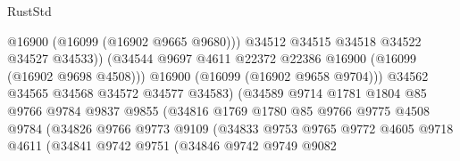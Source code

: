 \begin{lexlean}{RustStd}
\begin{coremodule}
                                          @16900
                                          (@16099 (@16902 @9665 @9680)))
                                        @34512
                                        @34515
                                        @34518
                                        @34522
                                        @34527
                                        @34533))
                                    (@34544
                                      @9697
                                      @4611
                                      @22372
                                      @22386
                                      @16900
                                      (@16099 (@16902 @9698 @4508)))
                                    @16900
                                    (@16099 (@16902 @9658 @9704)))
                                  @34562
                                  @34565
                                  @34568
                                  @34572
                                  @34577
                                  @34583)
                                (@34589
                                  @9714
                                  @1781
                                  @1804
                                  @85
                                  @9766
                                  @9784
                                  @9837
                                  @9855
                                  (@34816
                                    @1769
                                    @1780
                                    @85
                                    @9766
                                    @9775
                                    @4508
                                    @9784
                                    (@34826
                                      @9766
                                      @9773
                                      @9109
                                      (@34833
                                        @9753
                                        @9765
                                        @9772
                                        @4605
                                        @9718
                                        @4611
                                        (@34841
                                          @9742
                                          @9751
                                          (@34846
                                            @9742
                                            @9749
                                            @9082

\end{coremodule}
\end{lexlean}
